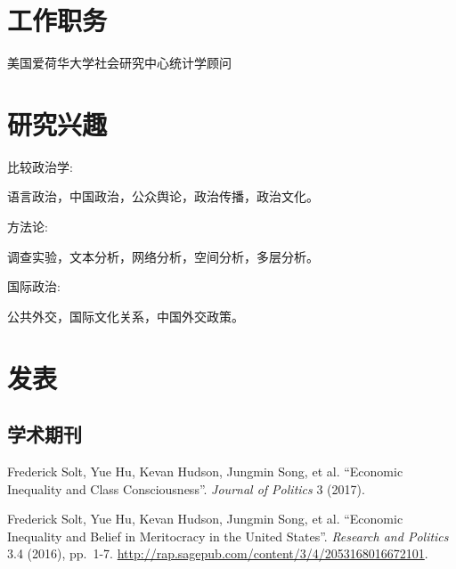 \documentclass[10.5pt,]{article}
\providecommand{\tightlist}{%
  \setlength{\itemsep}{0pt}\setlength{\parskip}{0pt}}
\renewenvironment{itemize}{
  \begin{list}{}{
    \setlength{\leftmargin}{1.5em}
  }
}{
  \end{list}
}
\begin{document}
\section{工作职务}

\begin{itemize}
\tightlist
\item
  美国爱荷华大学社会研究中心统计学顾问
\end{itemize}

\section{研究兴趣}

\begin{itemize}
\tightlist
\item
  比较政治学:

  \begin{itemize}
  \tightlist
  \item
    语言政治，中国政治，公众舆论，政治传播，政治文化。
  \end{itemize}
\item
  方法论:

  \begin{itemize}
  \tightlist
  \item
    调查实验，文本分析，网络分析，空间分析，多层分析。
  \end{itemize}
\item
  国际政治:

  \begin{itemize}
  \tightlist
  \item
    公共外交，国际文化关系，中国外交政策。
  \end{itemize}
\end{itemize}

\section{发表}

\subsection{学术期刊}

Frederick Solt, Yue Hu, Kevan Hudson, Jungmin Song, et al. ``Economic
Inequality and Class Consciousness''. \emph{Journal of Politics} 3
(2017).

Frederick Solt, Yue Hu, Kevan Hudson, Jungmin Song, et al. ``Economic
Inequality and Belief in Meritocracy in the United States''.
\emph{Research and Politics} 3.4 (2016), pp.~1-7.
\url{http://rap.sagepub.com/content/3/4/2053168016672101}.
\end{document}

